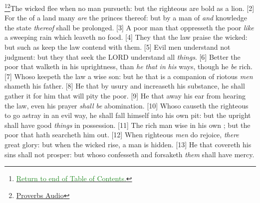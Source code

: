 \footnote{\textcolor[cmyk]{0.99998,1,0,0}{\hyperlink{TOC}
{\textcolor{ForestGreen}{Return to end of Table of Contents.}}}}\footnote{\href{https://www.audioverse.org/english/audiobibles/books/ENGKJV/O/Prov/1}{\textcolor[cmyk]{0.99998,1,0,0}{Proverbs Audio}}}\textcolor[cmyk]{0.99998,1,0,0}{The wicked flee when no man pursueth: but the righteous are bold as a lion.}
[2] \textcolor[cmyk]{0.99998,1,0,0}{For the  of a land many \emph{are} the princes thereof: but by a man of  \emph{and} knowledge the state \emph{thereof} shall be prolonged.}
[3] \textcolor[cmyk]{0.99998,1,0,0}{A poor man that oppresseth the poor  \emph{like} a sweeping rain which leaveth no food.}
[4] \textcolor[cmyk]{0.99998,1,0,0}{They that  the law praise the wicked: but such as keep the law contend with them.}
[5] \textcolor[cmyk]{0.99998,1,0,0}{Evil men understand not judgment: but they that seek the LORD understand all \emph{things}.}
[6] \textcolor[cmyk]{0.99998,1,0,0}{Better  the poor that walketh in his uprightness, than \emph{he} \emph{that}   \emph{in} \emph{his} ways, though he \emph{be} rich.}
[7] \textcolor[cmyk]{0.99998,1,0,0}{Whoso keepeth the law  a wise son: but he that is a companion of riotous \emph{men} shameth his father.}
[8] \textcolor[cmyk]{0.99998,1,0,0}{He that by usury and  increaseth his substance, he shall gather it for him that will pity the poor.}
[9] \textcolor[cmyk]{0.99998,1,0,0}{He that  away his ear from hearing the law, even his prayer \emph{shall} \emph{be} abomination.}
[10] \textcolor[cmyk]{0.99998,1,0,0}{Whoso causeth the righteous to go astray in an evil way, he shall fall himself into his own pit: but the upright shall have good \emph{things} in possession.}
[11] \textcolor[cmyk]{0.99998,1,0,0}{The rich man  wise in his own ; but the poor that hath  searcheth him out.}
[12] \textcolor[cmyk]{0.99998,1,0,0}{When righteous \emph{men} do rejoice, \emph{there}  great glory: but when the wicked rise, a man is hidden.}
[13] \textcolor[cmyk]{0.99998,1,0,0}{He that covereth his sins shall not prosper: but whoso confesseth and forsaketh \emph{them} shall have mercy.}
